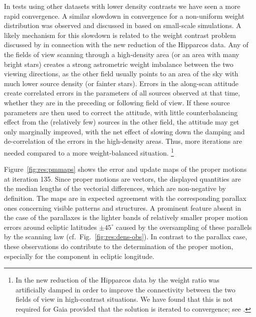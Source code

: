 \documentclass[structabstract]{aa}
\begin{document}
In tests using other datasets with lower density contrasts we have seen a more
rapid convergence. A similar slowdown in convergence for a non-uniform weight
distribution was observed and discussed in \citet{bombrun+10} based on small-scale
simulations. A likely mechanism for this slowdown is related to the
weight contrast problem discussed by \citet{2005A&A...439..805V} in connection
with the new reduction of the Hipparcos data.  
Any of the fields of view scanning through a 
high-density area (or an area with many bright stars) creates a strong astrometric 
weight imbalance between the two viewing directions, as the other field usually 
points to an area of the sky with much lower source density (or fainter stars). 
Errors in the along-scan attitude create correlated 
errors in the parameters of all sources observed at that time, whether they are
in the preceding or following field of view. If these source parameters are then 
used to correct the attitude, with little counterbalancing effect from the 
(relatively few) sources in the other field, the attitude may get only marginally 
improved, with the net effect of slowing down the damping and de-correlation
of the errors in the high-density areas. Thus, more iterations are needed compared
to a more weight-balanced situation.%
\footnote{In the new reduction of the Hipparcos data by \citet{book:newhip} 
the weight ratio was artificially damped in order to improve the connectivity between 
the two fields of view in high-contrast situations. We have found that this is not 
required for Gaia provided that the solution is iterated to convergence; see 
\citet{bombrun+10}.}  

Figure~\ref{fig:res:pmmaps} shows the error and update maps of the proper
motions at iteration 135. Since proper motions are vectors, the displayed
quantities are the median lengths of the vectorial differences, which are 
non-negative by definition. The maps are in expected agreement with the 
corresponding parallax ones concerning visible patterns and structures. 
A prominent feature absent in the case of the parallaxes is the lighter 
bands of relatively smaller proper motion errors around ecliptic latitudes
$\pm 45^\circ$ caused by the oversampling of these parallels by the scanning
law (cf.\ Fig.~\ref{fig:res:dens-obs}). In contrast to the parallax case, these 
observations do contribute to the determination of the proper motion,
especially for the component in ecliptic longitude.
\end{document}
